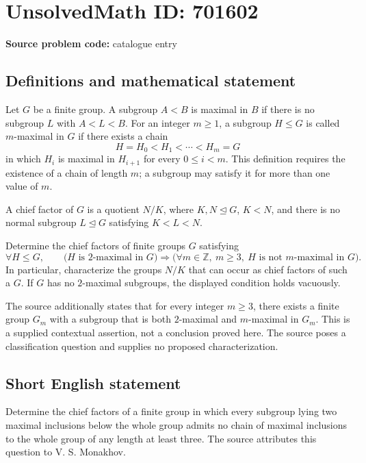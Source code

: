 \documentclass[11pt]{article}
\newcommand{\Z}{\mathbb{Z}}
\begin{document}
\section*{UnsolvedMath ID: 701602}
\textbf{Source problem code:} catalogue entry
\subsection{Definitions and mathematical statement}
Let \(G\) be a finite group. A subgroup \(A<B\) is maximal in \(B\) if there is no subgroup \(L\) with \(A<L<B\). For an integer \(m\geq 1\), a subgroup \(H\leq G\) is called \(m\)-maximal in \(G\) if there exists a chain
\[
H=H_0<H_1<\cdots<H_m=G
\]
in which \(H_i\) is maximal in \(H_{i+1}\) for every \(0\leq i<m\). This definition requires the existence of a chain of length \(m\); a subgroup may satisfy it for more than one value of \(m\).

A chief factor of \(G\) is a quotient \(N/K\), where \(K,N\trianglelefteq G\), \(K<N\), and there is no normal subgroup \(L\trianglelefteq G\) satisfying \(K<L<N\).

Determine the chief factors of finite groups \(G\) satisfying
\[
\forall H\leq G,\qquad
\bigl(H\text{ is }2\text{-maximal in }G\bigr)
\Longrightarrow
\bigl(\forall m\in\Z,\ m\geq3,\ H\text{ is not }m\text{-maximal in }G\bigr).
\]
In particular, characterize the groups \(N/K\) that can occur as chief factors of such a \(G\). If \(G\) has no \(2\)-maximal subgroups, the displayed condition holds vacuously.

The source additionally states that for every integer \(m\geq3\), there exists a finite group \(G_m\) with a subgroup that is both \(2\)-maximal and \(m\)-maximal in \(G_m\). This is a supplied contextual assertion, not a conclusion proved here. The source poses a classification question and supplies no proposed characterization.
\subsection{Short English statement}
Determine the chief factors of a finite group in which every subgroup lying two maximal inclusions below the whole group admits no chain of maximal inclusions to the whole group of any length at least three. The source attributes this question to V. S. Monakhov.
\end{document}
